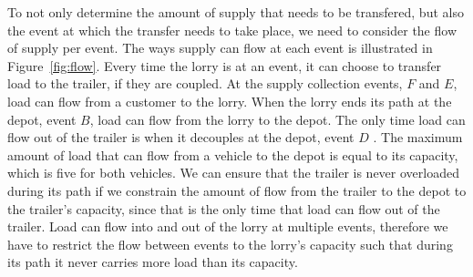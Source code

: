 To not only determine the amount of supply that needs to be transfered, but also the event at which the transfer needs to take place, we need to consider the flow of supply per event. The ways supply can flow at each event is illustrated in Figure~\ref{fig:flow}.
Every time the lorry is at an event, it can choose to transfer load to the trailer, if they are coupled.
At the supply collection events, $F$ and $E$,  load can flow from a customer to the lorry.
When the lorry ends its path at the depot, event $B$, load can flow from the lorry to the depot.
The only time load can flow out of the trailer is when it decouples at the depot, event $D$ .
The maximum amount of load that can flow from a vehicle to the depot is equal to its capacity, which is five for both vehicles.
We can ensure that the trailer is never overloaded during its path if we constrain the amount of flow from the trailer to the depot to the trailer's capacity, since that is the only time that load can flow out of the trailer.
Load can flow into and out of the lorry at multiple events, therefore we have to restrict the flow between events to the lorry's capacity such that during its path it never carries more load than its capacity.
\\









%
%

